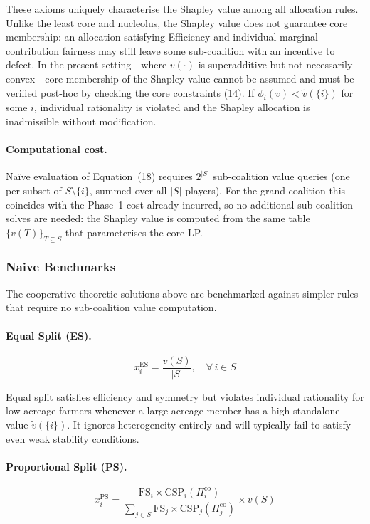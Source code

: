 \documentclass[manuscript, screen, review, anonymous]{acmart}
\begin{document}
These axioms uniquely characterise the Shapley value among all allocation
rules. Unlike the least core and nucleolus, the Shapley value does not
guarantee core membership: an allocation satisfying Efficiency and individual
marginal-contribution fairness may still leave some sub-coalition with an
incentive to defect. In the present setting---where $v(\cdot)$ is superadditive
but not necessarily convex---core membership of the Shapley value cannot be
assumed and must be verified post-hoc by checking the core constraints
(14). If $\phi_i(v) < \tilde{v}(\{i\})$ for some $i$, individual rationality
is violated and the Shapley allocation is inadmissible without modification.

\paragraph{Computational cost.}
Na\"ive evaluation of Equation~(18) requires $2^{|S|}$ sub-coalition value
queries (one per subset of $S \setminus \{i\}$, summed over all $|S|$ players).
For the grand coalition this coincides with the Phase~1 cost already incurred,
so no additional sub-coalition solves are needed: the Shapley value is computed
from the same table $\{v(T)\}_{T \subseteq S}$ that parameterises the core LP.

\subsubsection*{Naive Benchmarks}

The cooperative-theoretic solutions above are benchmarked against simpler
rules that require no sub-coalition value computation.

\paragraph{Equal Split (ES).}
\begin{equation}
    x_i^{\text{ES}} = \frac{v(S)}{|S|}, \quad \forall\, i \in S
\end{equation}

Equal split satisfies efficiency and symmetry but violates individual
rationality for low-acreage farmers whenever a large-acreage member has a high
standalone value $\tilde{v}(\{i\})$. It ignores heterogeneity entirely and
will typically fail to satisfy even weak stability conditions.

\paragraph{Proportional Split (PS).}
\begin{equation}
    x_i^{\text{PS}} =
    \frac{\text{FS}_i \times \text{CSP}_i(\Pi_i^{\text{co}})}
         {\sum_{j \in S} \text{FS}_j \times \text{CSP}_j(\Pi_j^{\text{co}})}
    \times v(S)
\end{equation}
\end{document}
